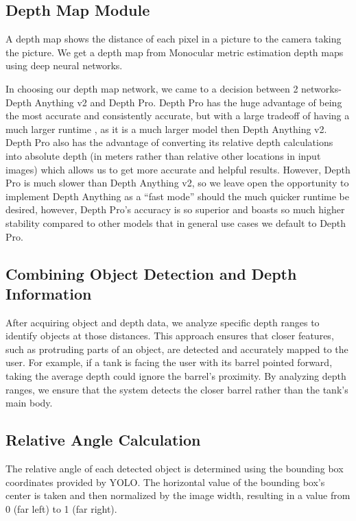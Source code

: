 \documentclass[12pt,a4paper]{article}
\begin{document}
\subsection{Depth Map Module}
A depth map shows the distance of each pixel in a picture to the camera taking the picture. We get a depth map from Monocular metric estimation depth maps using deep neural networks.

In choosing our depth map network, we came to a decision between 2 networks- Depth Anything v2 and Depth Pro. Depth Pro has the huge advantage of being the most accurate and consistently accurate, but with a large tradeoff of having a much larger runtime \cite{bochkovskii2024depth}, as it is a much larger model then Depth Anything v2. Depth Pro also has the advantage of converting its relative depth calculations into absolute depth (in meters rather than relative other locations in input images) which allows us to get more accurate and helpful results. However, Depth Pro is much slower than Depth Anything v2, so we leave open the opportunity to implement Depth Anything as a “fast mode” should the much quicker runtime be desired, however, Depth Pro’s accuracy is so superior and boasts so much higher stability compared to other models that in general use cases we default to Depth Pro.

\subsection{Combining Object Detection and Depth Information}
After acquiring object and depth data, we analyze specific depth ranges to identify objects at those distances. This approach ensures that closer features, such as protruding parts of an object, are detected and accurately mapped to the user. For example, if a tank is facing the user with its barrel pointed forward, taking the average depth could ignore the barrel’s proximity. By analyzing depth ranges, we ensure that the system detects the closer barrel rather than the tank's main body.

\subsection{Relative Angle Calculation}
The relative angle of each detected object is determined using the bounding box coordinates provided by YOLO. The horizontal value of the bounding box's center is taken and then normalized by the image width, resulting in a value from 0 (far left) to 1 (far right).
\end{document}
